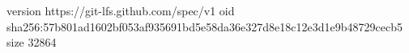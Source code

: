version https://git-lfs.github.com/spec/v1
oid sha256:57b801ad1602bf053af935691bd5e58da36e327d8e18c12e3d1e9b48729cecb5
size 32864
